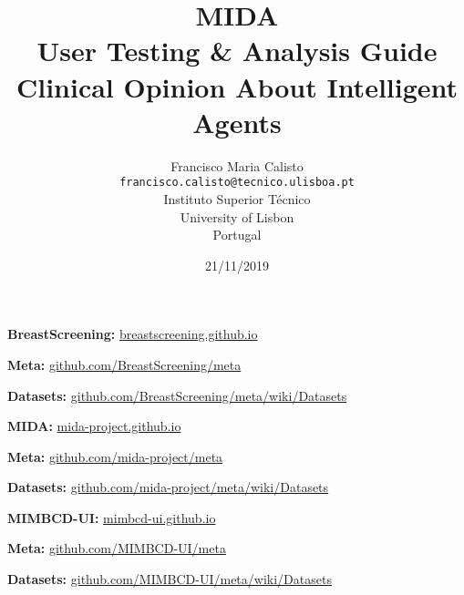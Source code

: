 \documentclass{article}
\title{
MIDA
\\
User Testing \& Analysis Guide
\\
Clinical Opinion About Intelligent Agents
\\
}
\author{
Francisco Maria Calisto\\
\texttt{francisco.calisto@tecnico.ulisboa.pt}\\
Instituto Superior T\'{e}cnico\\
University of Lisbon\\
Portugal
}
\date{21/11/2019}
\begin{document}
\maketitle

\textbf{BreastScreening:} \hfill \hyperlink{https://breastscreening.github.io/}{breastscreening.github.io}

\textbf{Meta:} \hfill \hyperlink{https://github.com/BreastScreening/meta}{github.com/BreastScreening/meta}

\textbf{Datasets:} \hfill \hyperlink{https://github.com/BreastScreening/meta/wiki/Datasets}{github.com/BreastScreening/meta/wiki/Datasets}

\hfill

\textbf{MIDA:} \hfill \hyperlink{https://mida-project.github.io/}{mida-project.github.io}

\textbf{Meta:} \hfill \hyperlink{https://github.com/mida-project/meta}{github.com/mida-project/meta}

\textbf{Datasets:} \hfill \hyperlink{https://github.com/mida-project/meta/wiki/Datasets}{github.com/mida-project/meta/wiki/Datasets}

\hfill

\textbf{MIMBCD-UI:} \hfill \hyperlink{https://mimbcd-ui.github.io/}{mimbcd-ui.github.io}

\textbf{Meta:} \hfill \hyperlink{https://github.com/MIMBCD-UI/meta}{github.com/MIMBCD-UI/meta}

\textbf{Datasets:} \hfill \hyperlink{https://github.com/MIMBCD-UI/meta/wiki/Datasets}{github.com/MIMBCD-UI/meta/wiki/Datasets}

\clearpage














\clearpage

\glsaddall
\printglossary[type=\acronymtype,title=Acronyms]

\clearpage



\end{document}
